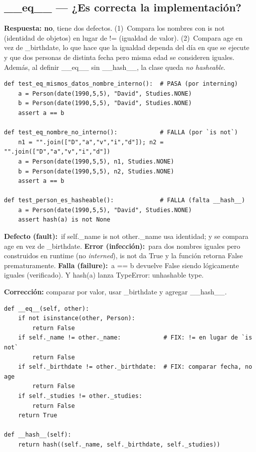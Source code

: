 \documentclass[11pt,a4paper]{article}
\newcommand{\defecto}{\textbf{\textcolor{bad}{Defecto (fault):}}\ }
\newcommand{\error}{\textbf{\textcolor{bad}{Error (infección):}}\ }
\newcommand{\falla}{\textbf{\textcolor{bad}{Falla (failure):}}\ }
\newcommand{\code}[1]{\colorbox{codebg}{\ttfamily\small #1}}
\begin{document}
\subsection{\code{\_\_eq\_\_} --- ¿Es correcta la implementación?}
\begin{answer}
\textbf{Respuesta: no}, tiene dos defectos. (1)~Compara los nombres con \code{is not} (identidad de
objetos) en lugar de \code{!=} (igualdad de valor). (2)~Compara \code{age} en vez de \code{\_birthdate},
lo que hace que la igualdad dependa del día en que se ejecute y que dos personas de distinta fecha
pero misma edad se consideren iguales. Además, al definir \code{\_\_eq\_\_} sin \code{\_\_hash\_\_},
la clase queda \emph{no hasheable}.
\end{answer}

\begin{lstlisting}[style=py]
def test_eq_mismos_datos_nombre_interno():  # PASA (por interning)
    a = Person(date(1990,5,5), "David", Studies.NONE)
    b = Person(date(1990,5,5), "David", Studies.NONE)
    assert a == b

def test_eq_nombre_no_interno():            # FALLA (por `is not`)
    n1 = "".join(["D","a","v","i","d"]); n2 = "".join(["D","a","v","i","d"])
    a = Person(date(1990,5,5), n1, Studies.NONE)
    b = Person(date(1990,5,5), n2, Studies.NONE)
    assert a == b

def test_person_es_hasheable():             # FALLA (falta __hash__)
    a = Person(date(1990,5,5), "David", Studies.NONE)
    assert hash(a) is not None
\end{lstlisting}

\begin{def-err-fail}
\defecto \code{if self.\_name is not other.\_name} usa identidad; y se compara \code{age} en vez de \code{\_birthdate}.\quad
\error para dos nombres iguales pero construidos en runtime (no \emph{interned}), \code{is not} da
\code{True} y la función retorna \code{False} prematuramente.\quad
\falla \code{a == b} devuelve \code{False} siendo lógicamente iguales (verificado). Y \code{hash(a)}
lanza \code{TypeError: unhashable type}.
\end{def-err-fail}

\begin{answer}\small\textbf{Corrección:} comparar por valor, usar \code{\_birthdate} y agregar \code{\_\_hash\_\_}.
\begin{lstlisting}[style=py]
def __eq__(self, other):
    if not isinstance(other, Person):
        return False
    if self._name != other._name:            # FIX: != en lugar de `is not`
        return False
    if self._birthdate != other._birthdate:  # FIX: comparar fecha, no age
        return False
    if self._studies != other._studies:
        return False
    return True

def __hash__(self):
    return hash((self._name, self._birthdate, self._studies))
\end{lstlisting}
\end{answer}
\end{document}
